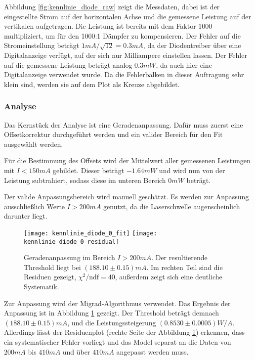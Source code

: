 \documentclass{../Misc/MontavonLaTeX/Montavon}
\newcommand{\halfwidth}{0.48\textwidth}
\begin{document}
Abbildung \ref{fig:kennlinie_diode_raw} zeigt die Messdaten, dabei ist der eingestellte Strom auf der horizontalen Achse und die gemessene Leistung auf der vertikalen aufgetragen. Die Leistung ist bereits mit dem Faktor 1000 multipliziert, um für den 1000:1 Dämpfer zu kompensieren. Der Fehler auf die Stromeinstellung beträgt $1 \unit{mA} / \sqrt{12} = 0.3 \unit{mA}$, da der Diodentreiber über eine Digitalanzeige verfügt, auf der sich nur Milliampere einstellen lassen. Der Fehler auf die gemessene Leistung beträgt analog $0.3 \unit{mW}$, da auch hier eine Digitalanzeige verwendet wurde. Da die Fehlerbalken in dieser Auftragung sehr klein sind, werden sie auf dem Plot als Kreuze abgebildet.

\subsubsection{Analyse}
Das Kernstück der Analyse ist eine Geradenanpassung. Dafür muss zuerst eine Offsetkorrektur durchgeführt werden und ein valider Bereich für den Fit ausgewählt werden. 


Für die Bestimmung des Offsets wird der Mittelwert aller gemessenen Leistungen mit $I < 150 \unit{mA}$ gebildet. Dieser beträgt $-1.64 \unit{mW}$ und wird nun von der Leistung subtrahiert, sodass diese im unteren Bereich $0 \unit{mW}$ beträgt.

Der valide Anpassungsbereich wird manuell geschätzt. Es werden zur Anpassung ausschließlich Werte $I > 200 \unit{mA}$ genutzt, da die Laserschwelle augenscheinlich darunter liegt.

\begin{figure}[htbp]
\centering
\texttt{[image: kennlinie\_diode\_0\_fit]}
\texttt{[image: kennlinie\_diode\_0\_residual]}
\caption{Geradenanpassung im Bereich $I > 200 \unit{mA}$. Der resultierende Threshold liegt bei $(188.10 \pm 0.15) \unit{mA}$. Im rechten Teil sind die Residuen gezeigt, $\chi^2 / \textrm{ndf} = 40$, außerdem zeigt sich eine deutliche Systematik.}
\label{fig:kennlinie_diode_0_fit}
\end{figure}

Zur Anpassung wird der Migrad-Algorithmus verwendet. Das Ergebnis der Anpassung ist in Abbildung \ref{fig:kennlinie_diode_0_fit} gezeigt. Der Threshold beträgt demnach $(188.10 \pm 0.15) \unit{mA}$, und die Leistungssteigerung $(0.8530 \pm 0.0005) \unit{W/A}$. Allerdings lässt der Residuenplot (rechte Seite der Abbildung \ref{fig:kennlinie_diode_0_fit}) erkennen, dass ein systematischer Fehler vorliegt und das Model separat an die Daten von $200 \unit{mA}$ bis $410 \unit{mA}$ und über $410 \unit{mA}$ angepasst werden muss.
\end{document}
